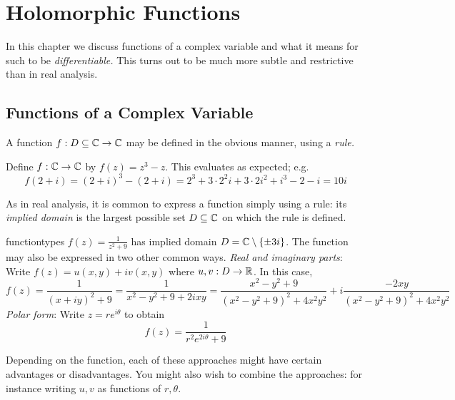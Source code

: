 \graphicspath{{2holom/asy/}}
\thispagestyle{empty}


\section{Holomorphic Functions}\label{chap:holom}

In this chapter we discuss functions of a complex variable and what it means for such to be \emph{differentiable.} This turns out to be much more subtle and restrictive than in real analysis.

\subsection{Functions of a Complex Variable}\label{sec:func}%

A function $f:D\subseteq\mathbb{C}\to\mathbb{C}$ may be defined in the obvious manner, using a \emph{rule.}

\begin{example}{}{}
Define $f:\mathbb{C}\to\mathbb{C}$ by $f(z)=z^3-z$. This evaluates as expected; e.g.
\[f(2+i)=(2+i)^3-(2+i)=2^3+3\cdot 2^2i+3\cdot 2i^2+i^3-2-i=10i\]
\end{example}


As in real analysis, it is common to express a function simply using a rule: its \emph{implied domain} is the largest possible set $D\subseteq \mathbb{C}$ on which the rule is defined.

\begin{example}{}{functiontypes}
$f(z)=\frac 1{z^2+9}$ has implied domain $D=\mathbb{C}\setminus\{\pm 3i\}$.\smallbreak
The function may also be expressed in two other common ways.\smallbreak
\emph{Real and imaginary parts}: Write $f(z)=u(x,y)+iv(x,y)$ where $u,v:D\to\mathbb{R}$. In this case,
  \[f(z)=\frac 1{(x+iy)^2+9}=\frac 1{x^2-y^2+9+2ixy}=\frac{x^2-y^2+9}{(x^2-y^2+9)^2+4x^2y^2} +i \frac{-2xy}{(x^2-y^2+9)^2+4x^2y^2}\]
\emph{Polar form}: Write $z=re^{i\theta}$ to obtain
  \[f(z)=\frac 1{r^2e^{2i\theta}+9}\]
\end{example}
Depending on the function, each of these approaches might have certain advantages or disadvantages. You might also wish to combine the approaches: for instance writing $u,v$ as functions of $r,\theta$.


